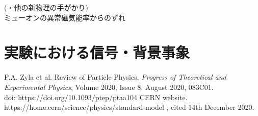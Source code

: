 \documentclass[Yonemoto_master.tex]{subfiles}
\begin{document}
(・他の新物理の手がかり) \\
ミューオンの異常磁気能率からのずれ

\section{実験における信号・背景事象}


{  }{
\begin{thebibliography}{99}
 P.A. Zyla et al. Review of Particle Physics.  {\it Progress of Theoretical and Experimental Physics}, Volume 2020, Issue 8, August 2020, 083C01. \\
doi: https://doi.org/10.1093/ptep/ptaa104
 CERN website. https://home.cern/science/physics/standard-model , cited 14th December 2020.
\end{thebibliography}
}
\end{document}
